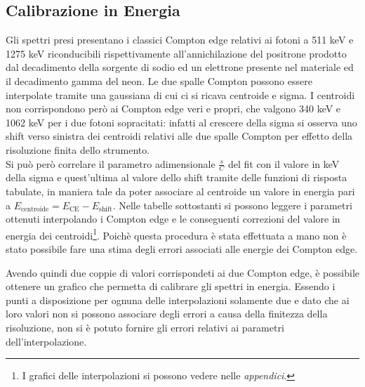 \subsection{Calibrazione in Energia}
Gli spettri presi presentano i classici Compton edge relativi ai fotoni a 511 keV e 1275 keV riconducibili rispettivamente
all'annichilazione del positrone prodotto dal decadimento della sorgente di sodio ed un elettrone presente nel materiale ed il decadimento gamma del neon. Le due spalle Compton possono
essere interpolate tramite una gaussiana di cui ci si ricava centroide e sigma. I centroidi non corrispondono però ai Compton edge veri e propri, che valgono
340 keV e 1062 keV per i due fotoni sopracitati: infatti al crescere della sigma si osserva uno shift verso sinistra dei centroidi relativi alle due spalle Compton
per effetto della risoluzione finita dello strumento. \\
Si può però correlare il parametro adimensionale \(\frac{s}{C}\) del fit con il valore in keV della sigma e quest'ultima al valore dello shift tramite delle funzioni di 
risposta tabulate, in maniera tale da poter associare al centroide un valore in energia pari a \(E_{\text{centroide}} = E_{\text{CE}} - E_{\text{shift}}\).  Nelle tabelle
sottostanti si possono leggere i parametri ottenuti interpolando i Compton edge e le conseguenti correzioni del valore in energia dei centroidi\footnote{I grafici
delle interpolazioni si possono vedere nelle \textit{appendici}.}. Poichè questa procedura è stata effettuata a mano non è stato possibile fare una stima degli errori 
associati alle energie dei Compton edge.


%
\begin{table}[h]
	\centering
	
	\caption{Procedura calibrazione del rivelatore 1}
	\label{tab:calib_shift_1}
\end{table}
%
%
\begin{table}[h]
	\centering
	
	\caption{Procedura calibrazione del rivelatore 2}
	\label{tab:calib__shift_2}
\end{table}
%
Avendo quindi due coppie di valori corrispondeti ai due Compton edge, è possibile ottenere un grafico che permetta di calibrare gli spettri in energia.
Essendo i punti a disposizione per ognuna delle interpolazioni solamente due e dato che ai loro valori non si possono associare degli errori a causa della finitezza della risoluzione, non si è potuto fornire gli errori relativi ai parametri dell'interpolazione.


